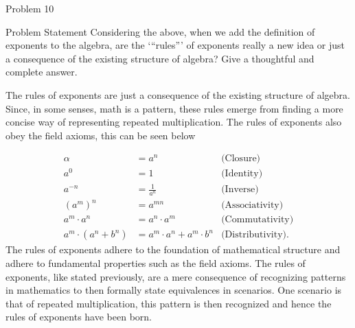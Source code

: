 \begin{problem}{Problem 10}
    \begin{statement}{Problem Statement}
        Considering the above, when we add the definition of exponents to the algebra, are the `“rules”' of exponents really a new idea or just a consequence of the existing structure of algebra? Give 
        a thoughtful and complete answer.
    \end{statement}

    \begin{Highlight}[Solution]
        The rules of exponents are just a consequence of the existing structure of algebra. Since, in some senses, math is a pattern, these rules emerge from finding a more concise way of representing
        repeated multiplication. The rules of exponents also obey the field axioms, this can be seen below

        \begin{align*}
            \alpha & = a^{n} & \text{(Closure)} \\
            a^{0} & = 1 & \text{(Identity)} \\
            a^{-n} & = \frac{1}{a^{n}} & \text{(Inverse)} \\
            (a^{m})^{n} & = a^{mn} & \text{(Associativity)} \\
            a^{m}\cdot a^{n} & = a^{n}\cdot a^{m} & \text{(Commutativity)} \\
            a^{m}\cdot (a^{n} + b^{n}) & = a^{m} \cdot a^{n} + a^{m} \cdot b^{n} & \text{(Distributivity)}.
        \end{align*}
        The rules of exponents adhere to the foundation of mathematical structure and adhere to fundamental properties such as the field axioms. The rules of exponents, like stated previously, are a mere
        consequence of recognizing patterns in mathematics to then formally state equivalences in scenarios. One scenario is that of repeated multiplication, this pattern is then recognized and hence the
        rules of exponents have been born.
    \end{Highlight}
\end{problem}

